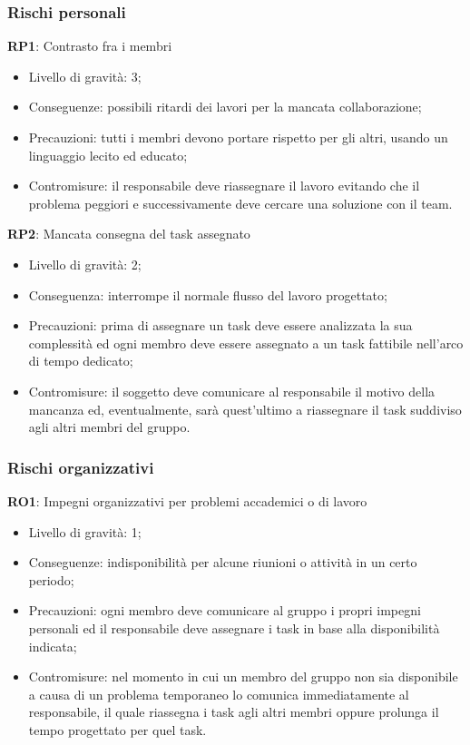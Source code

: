 \subsubsection{Rischi personali}
\textbf{RP1}: 
Contrasto fra i membri
\begin{itemize}
\item Livello di gravità: 3;
\item Conseguenze: possibili ritardi dei lavori per la mancata collaborazione;
\item Precauzioni: tutti i membri devono portare rispetto per gli altri, usando un linguaggio lecito ed educato;
\item Contromisure: il responsabile deve riassegnare il lavoro evitando che il problema peggiori e successivamente deve cercare una soluzione con il team.
\end{itemize}
\textbf{RP2}:
Mancata consegna del task assegnato
\begin{itemize}
\item Livello di gravità: 2;
\item Conseguenza: interrompe il normale flusso del lavoro progettato;
\item Precauzioni: prima di assegnare un task deve essere analizzata la sua complessità ed ogni membro deve essere assegnato a un task fattibile nell'arco di tempo dedicato;
\item Contromisure: il soggetto deve comunicare al responsabile il motivo della mancanza ed, eventualmente, sarà quest'ultimo a riassegnare il task suddiviso agli altri membri del gruppo.
\end{itemize}

\subsubsection{Rischi organizzativi}
\textbf{RO1}: 
Impegni organizzativi per problemi accademici o di lavoro
\begin{itemize}
\item Livello di gravità: 1;
\item Conseguenze: indisponibilità per alcune riunioni o attività in un certo periodo;
\item Precauzioni: ogni membro deve comunicare al gruppo i propri impegni personali ed il responsabile deve assegnare i task in base alla disponibilità indicata;
\item Contromisure: nel momento in cui un membro del gruppo non sia disponibile a causa di un problema temporaneo lo comunica immediatamente al responsabile, il quale riassegna i task agli altri membri oppure prolunga il tempo progettato per quel task.
\end{itemize}

